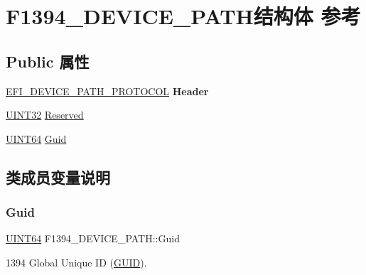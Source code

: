 \hypertarget{struct_f1394___d_e_v_i_c_e___p_a_t_h}{}\section{F1394\+\_\+\+D\+E\+V\+I\+C\+E\+\_\+\+P\+A\+T\+H结构体 参考}
\label{struct_f1394___d_e_v_i_c_e___p_a_t_h}
\subsection*{Public 属性}
\begin{DoxyCompactItemize}
\item 
\mbox{\label{struct_f1394___d_e_v_i_c_e___p_a_t_h_a58cf762fd7da5e89dff1a09115f69485}} 
\hyperlink{struct_e_f_i___d_e_v_i_c_e___p_a_t_h___p_r_o_t_o_c_o_l}{E\+F\+I\+\_\+\+D\+E\+V\+I\+C\+E\+\_\+\+P\+A\+T\+H\+\_\+\+P\+R\+O\+T\+O\+C\+OL} {\bfseries Header}
\item 
\hyperlink{_processor_bind_8h_ae1e6edbbc26d6fbc71a90190d0266018}{U\+I\+N\+T32} \hyperlink{struct_f1394___d_e_v_i_c_e___p_a_t_h_a8965be2daba15287c9308a8f44855c64}{Reserved}
\item 
\hyperlink{_processor_bind_8h_a57be03562867144161c1bfee95ca8f7c}{U\+I\+N\+T64} \hyperlink{struct_f1394___d_e_v_i_c_e___p_a_t_h_abe2e1a7e6911e84c1d4f7d60fd826560}{Guid}
\end{DoxyCompactItemize}


\subsection{类成员变量说明}
\mbox{\label{struct_f1394___d_e_v_i_c_e___p_a_t_h_abe2e1a7e6911e84c1d4f7d60fd826560}} 
\subsubsection{\texorpdfstring{Guid}{Guid}}
{\footnotesize\ttfamily \hyperlink{_processor_bind_8h_a57be03562867144161c1bfee95ca8f7c}{U\+I\+N\+T64} F1394\+\_\+\+D\+E\+V\+I\+C\+E\+\_\+\+P\+A\+T\+H\+::\+Guid}

1394 Global Unique ID (\hyperlink{interface_g_u_i_d}{G\+U\+ID}). \mbox{\label{struct_f1394___d_e_v_i_c_e___p_a_t_h_a8965be2daba15287c9308a8f44855c64}} 
